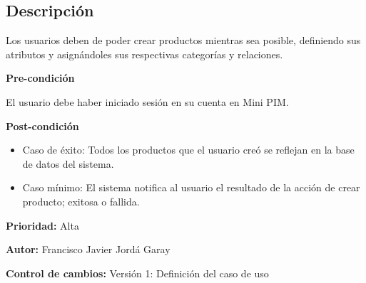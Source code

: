 {}

\subsection*{Descripción}
Los usuarios deben de poder crear productos mientras sea posible, definiendo sus atributos y asignándoles sus respectivas categorías y relaciones.\par
\vspace{0.15cm}

\textbf{Pre-condición}\par
El usuario debe haber iniciado sesión en su cuenta en Mini PIM.\par
\vspace{0.15cm}

\textbf{Post-condición}
\begin{itemize}
    \item Caso de éxito: Todos los productos que el usuario creó se reflejan en la base de datos del sistema.
    \item Caso mínimo: El sistema notifica al usuario el resultado de la acción de crear producto; exitosa o fallida.
\end{itemize}

\textbf{Prioridad: }
Alta
\vspace{0.15cm}

\textbf{Autor: }
Francisco Javier Jordá Garay\par
\vspace{0.15cm}

\textbf{Control de cambios: } Versión 1: Definición del caso de uso

